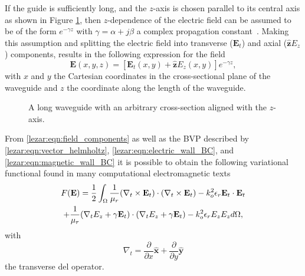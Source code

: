 If the guide is sufficiently long, and the $z$-axis is chosen parallel
to its central axis as shown in Figure \ref{lezar:fig:long_waveguide}, then
$z$-dependence of the electric field can be assumed to be of the form
$e^{-\gamma z}$ with $\gamma = \alpha + j\beta$ a complex
propagation constant~\cite{PelosiCoccioliSelleri1998,
Poz2005}.  Making this assumption and splitting the electric field
into transverse ($\mathbf{E}_t$) and axial ($\hat{\mathbf{z}}E_z$) components,
results in the following expression for the field
\begin{equation}
    \label{lezar:eqn:field_components}
    \mathbf{E}(x,y,z) = [\mathbf{E}_t(x,y) + \hat{\mathbf{z}}E_z(x,y)]e^{-\gamma z},
\end{equation}
with $x$ and $y$ the Cartesian coordinates in the cross-sectional plane of the
waveguide and $z$ the coordinate along the length of the waveguide.

\begin{figure}
 \centering
 \caption{A long waveguide with an arbitrary cross-section aligned with the $z$-axis.}
 \label{lezar:fig:long_waveguide}
\end{figure}

From \eqref{lezar:eqn:field_components} as well as the BVP described by
\eqref{lezar:eqn:vector_helmholtz}, \eqref{lezar:eqn:electric_wall_BC}, and
\eqref{lezar:eqn:magnetic_wall_BC} it is possible to obtain the following
variational functional found in many computational electromagnetic
texts
\cite{Jin2002, PelCoc1998}
\begin{multline}
    \label{lezar:eqn:functional}
    F(\mathbf{E}) = \frac{1}{2}\int_{\Omega}\frac{1}{\mu_r}(\curl{\mathbf{E}_t}{t})\cdot(\curl{\mathbf{E}_t}{t}) -k_o^2\epsilon_r\mathbf{E}_t\cdot{\mathbf{E}_t}\\
    +\frac{1}{\mu_r}(\nabla_t{E_z} + \gamma\mathbf{E}_t)\cdot(\nabla_t{E_z} + \gamma\mathbf{E}_t)
    -k_o^2\epsilon_r E_z{E_z} d\Omega,
\end{multline}
with
\begin{equation}
    \nabla_t = \frac{\partial}{\partial x}\hat{\mathbf{x}} + \frac{\partial}{\partial
    y}\hat{\mathbf{y}}
\end{equation}
the transverse del operator.

